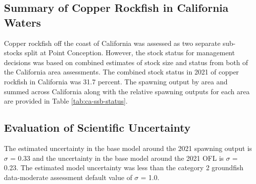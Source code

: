 \documentclass[11pt,
  english,
  a4paper,
]{article}
\begin{document}
\leavevmode\tagmcend\tagstructend\par


\hypertarget{summary-of-copper-rockfish-in-california-waters}{%
\subsection{Summary of Copper Rockfish in California Waters}\label{summary-of-copper-rockfish-in-california-waters}}

\leavevmode\tagmcend\tagstructend


Copper rockfish off the coast of California was assessed as two separate sub-stocks split at Point Conception. However, the stock status for management decisions was based on combined estimates of stock size and status from both of the California area assessments. The combined stock status in 2021 of copper rockfish in California was 31.7 percent. The spawning output by area and summed across California along with the relative spawning outputs for each area are provided in Table \ref{tab:ca-ssb-status}.

\leavevmode\tagmcend\tagstructend\par


\hypertarget{evaluation-of-scientific-uncertainty}{%
\subsection{Evaluation of Scientific Uncertainty}\label{evaluation-of-scientific-uncertainty}}

\leavevmode\tagmcend\tagstructend


The estimated uncertainty in the base model around the 2021 spawning output is {\(\sigma\)\leavevmode\tagmcend\tagstructend} = 0.33 and the uncertainty in the base model around the 2021 OFL is {\(\sigma\)\leavevmode\tagmcend\tagstructend} = 0.23. The estimated model uncertainty was less than the category 2 groundfish data-moderate assessment default value of {\(\sigma\)\leavevmode\tagmcend\tagstructend} = 1.0.
\end{document}
